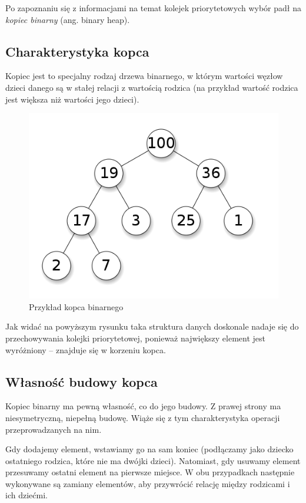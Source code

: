 \documentclass[12pt,a4paper]{article}
\begin{document}
Po zapoznaniu się z informacjami na temat kolejek priorytetowych wybór padł na \textit{kopiec binarny} (ang. binary heap).

\subsection{Charakterystyka kopca}

Kopiec jest to specjalny rodzaj drzewa binarnego, w którym wartości węzłow dzieci danego są w stałej relacji z wartością rodzica (na przykład wartość rodzica jest większa niż wartości jego dzieci).

\begin{figure}[h]
	\centering
	\includegraphics[scale=0.5]{img/heap.png} 
	\caption{Przykład kopca binarnego}
\end{figure}

Jak widać na powyższym rysunku taka struktura danych doskonale nadaje się do przechowywania kolejki priorytetowej, ponieważ największy element jest wyróżniony -- znajduje się w korzeniu kopca.

\subsection{Własność budowy kopca}

Kopiec binarny ma pewną własność, co do jego budowy. Z prawej strony ma niesymetryczną, niepełną budowę. Wiąże się z tym charakterystyka operacji przeprowadzanych na nim.

Gdy dodajemy element, wstawiamy go na sam koniec (podłączamy jako dziecko ostatniego rodzica, które nie ma dwójki dzieci). Natomiast, gdy usuwamy element przesuwamy ostatni element na pierwsze miejsce. W obu przypadkach następnie wykonywane są zamiany elementów, aby przywrócić relację między rodzicami i ich dziećmi.
\end{document}
